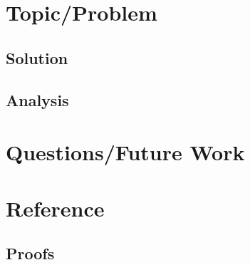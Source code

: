 










\section{Topic/Problem}





\subsection{Solution}




\subsection{Analysis}



\section{Questions/Future Work}



\appendix
\section{Reference}

\subsection{Proofs}
%

